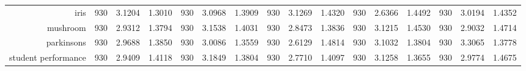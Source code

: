\begin{table}[H]
{\begin{tabular}{rccccccccccccccc}
			iris                                & 930                                     & 3.1204                                                                    & 1.3010          & 930                            & 3.0968                                                                    & 1.3909          & 930                             & 3.1269                                                                             & 1.4320          & 930                             & \cellcolor[rgb]{ .776,  .937,  .808}\textcolor[rgb]{ 0,  .38,  0}{2.6366} & 1.4492          & 930                             & 3.0194                                                                    & 1.4352          \\
			mushroom                            & 930                                     & 2.9312                                                                    & 1.3794          & 930                            & 3.1538                                                                    & 1.4031          & 930                             & \cellcolor[rgb]{ .776,  .937,  .808}\textcolor[rgb]{ 0,  .38,  0}{2.8473}          & 1.3836          & 930                             & 3.1215                                                                    & 1.4530          & 930                             & 2.9032                                                                    & 1.4714          \\
			parkinsons                          & 930                                     & 2.9688                                                                    & 1.3850          & 930                            & 3.0086                                                                    & 1.3559          & 930                             & \cellcolor[rgb]{ .776,  .937,  .808}\textcolor[rgb]{ 0,  .38,  0}{2.6129}          & 1.4814          & 930                             & 3.1032                                                                    & 1.3804          & 930                             & 3.3065                                                                    & 1.3778          \\
			student performance                 & 930                                     & 2.9409                                                                    & 1.4118          & 930                            & 3.1849                                                                    & 1.3804          & 930                             & \cellcolor[rgb]{ .776,  .937,  .808}\textcolor[rgb]{ 0,  .38,  0}{2.7710}          & 1.4097          & 930                             & 3.1258                                                                    & 1.3655          & 930                             & 2.9774                                                                    & 1.4675          \\

\end{tabular}}
\end{table}
